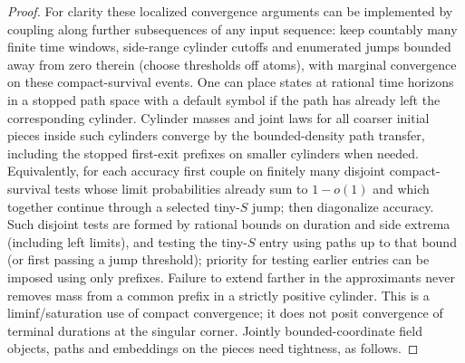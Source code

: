 \begin{proof}
For clarity these localized convergence arguments can be implemented by coupling along further subsequences of any input sequence: keep countably many finite time windows, side-range cylinder cutoffs and enumerated jumps bounded away from zero therein (choose thresholds off atoms), with marginal convergence on these compact-survival events.
One can place states at rational time horizons in a stopped path space with a default symbol if the path has already left the corresponding cylinder.
Cylinder masses and joint laws for all coarser initial pieces inside such cylinders converge by the bounded-density path transfer, including the stopped first-exit prefixes on smaller cylinders when needed.
Equivalently, for each accuracy first couple on finitely many disjoint compact-survival tests whose limit probabilities already sum to \(1-o(1)\) and which together continue through a selected tiny-\(S\) jump; then diagonalize accuracy.
Such disjoint tests are formed by rational bounds on duration and side extrema (including left limits), and testing the tiny-\(S\) entry using paths up to that bound (or first passing a jump threshold); priority for testing earlier entries can be imposed using only prefixes.
Failure to extend farther in the approximants never removes mass from a common prefix in a strictly positive cylinder.
This is a liminf/saturation use of compact convergence; it does not posit convergence of terminal durations at the singular corner.
Jointly bounded-coordinate field objects, paths and embeddings on the pieces need tightness, as follows.


\end{proof}

